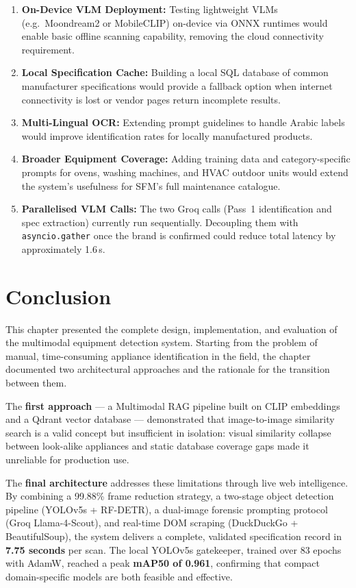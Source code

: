 \begin{enumerate}
  \item \textbf{On-Device VLM Deployment:} Testing lightweight VLMs (e.g.\ Moondream2 or MobileCLIP) on-device via ONNX runtimes would enable basic offline scanning capability, removing the cloud connectivity requirement.
  \item \textbf{Local Specification Cache:} Building a local SQL database of common manufacturer specifications would provide a fallback option when internet connectivity is lost or vendor pages return incomplete results.
  \item \textbf{Multi-Lingual OCR:} Extending prompt guidelines to handle Arabic labels would improve identification rates for locally manufactured products.
  \item \textbf{Broader Equipment Coverage:} Adding training data and category-specific prompts for ovens, washing machines, and HVAC outdoor units would extend the system's usefulness for SFM's full maintenance catalogue.
  \item \textbf{Parallelised VLM Calls:} The two Groq calls (Pass~1 identification and spec extraction) currently run sequentially. Decoupling them with \texttt{asyncio.gather} once the brand is confirmed could reduce total latency by approximately 1.6\,s.
\end{enumerate}

\section{Conclusion}
\label{sec:ch4-conclusion}

This chapter presented the complete design, implementation, and evaluation of the multimodal equipment detection system. Starting from the problem of manual, time-consuming appliance identification in the field, the chapter documented two architectural approaches and the rationale for the transition between them.

The \textbf{first approach} — a Multimodal RAG pipeline built on CLIP embeddings and a Qdrant vector database — demonstrated that image-to-image similarity search is a valid concept but insufficient in isolation: visual similarity collapse between look-alike appliances and static database coverage gaps made it unreliable for production use.

The \textbf{final architecture} addresses these limitations through live web intelligence. By combining a 99.88\% frame reduction strategy, a two-stage object detection pipeline (YOLOv5s + RF-DETR), a dual-image forensic prompting protocol (Groq Llama-4-Scout), and real-time DOM scraping (DuckDuckGo + BeautifulSoup), the system delivers a complete, validated specification record in \textbf{7.75 seconds} per scan. The local YOLOv5s gatekeeper, trained over 83 epochs with AdamW, reached a peak \textbf{mAP50 of 0.961}, confirming that compact domain-specific models are both feasible and effective.

